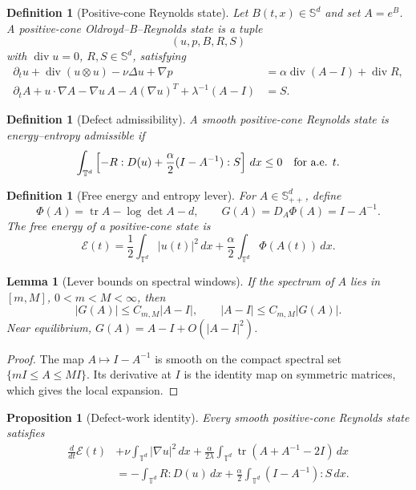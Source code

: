 \documentclass[11pt]{article}
\numberwithin{equation}{section}
\newtheorem{proposition}[theorem]{Proposition}
\newtheorem{lemma}[theorem]{Lemma}
\newtheorem{definition}[theorem]{Definition}
\newcommand{\T}{\mathbb T}
\newcommand{\Id}{I}
\newcommand{\Spp}{\mathbb S_{++}}
\newcommand{\Sym}{\mathbb S}
\newcommand{\tr}{\operatorname{tr}}
\newcommand{\divv}{\operatorname{div}}
\newcommand{\dd}{\,dx}
\newcommand{\calE}{\mathcal E}
\begin{document}
\begin{definition}[Positive-cone Reynolds state]
\label{def:positive-cone-reynolds-state}
Let \(B(t,x)\in\Sym^d\) and set \(A=e^B\).  A positive-cone
Oldroyd--B--Reynolds state is a tuple
\[
  (u,p,B,R,S)
\]
with \(\divv u=0\), \(R,S\in\Sym^d\), satisfying
\begin{align}
  \partial_t u+\divv(u\otimes u)-\nu\Delta u+\nabla p
  &=
  \alpha\divv(A-\Id)+\divv R, \label{eq:reynolds-momentum}\\
  \partial_t A+u\cdot\nabla A-\nabla u\,A-A(\nabla u)^T
  +\lambda^{-1}(A-\Id)
  &=
  S. \label{eq:reynolds-conf}
\end{align}
\end{definition}

\begin{definition}[Defect admissibility]
\label{def:defect-admissibility}
A smooth positive-cone Reynolds state is energy--entropy admissible if
\[
  \int_{\T^d}
  \left[
  -R:D(u)+\frac{\alpha}{2}(\Id-A^{-1}):S
  \right]\dd
  \le0
  \quad\hbox{for a.e. }t.
  \label{eq:admissible}
\]
\end{definition}

\begin{definition}[Free energy and entropy lever]
For \(A\in\Spp^d\), define
\[
  \Phi(A)=\tr A-\log\det A-d,
  \qquad
  G(A)=D_A\Phi(A)=\Id-A^{-1}.
\]
The free energy of a positive-cone state is
\[
  \calE(t)=
  \frac12\int_{\T^d}|u(t)|^2\,dx
  +
  \frac{\alpha}{2}\int_{\T^d}\Phi(A(t))\,dx .
\]
\end{definition}

\begin{lemma}[Lever bounds on spectral windows]
\label{lem:lever-bounds}
If the spectrum of \(A\) lies in \([m,M]\), \(0<m<M<\infty\), then
\[
  |G(A)|\le C_{m,M}|A-\Id|,
  \qquad
  |A-\Id|\le C_{m,M}|G(A)|.
\]
Near equilibrium, \(G(A)=A-\Id+O(|A-\Id|^2)\).
\end{lemma}

\begin{proof}
The map \(A\mapsto \Id-A^{-1}\) is smooth on the compact spectral set
\(\{m\Id\le A\le M\Id\}\).  Its derivative at \(\Id\) is the identity map on
symmetric matrices, which gives the local expansion.
\end{proof}

\begin{proposition}[Defect-work identity]
\label{prop:defect-work}
Every smooth positive-cone Reynolds state satisfies
\[
\begin{aligned}
  \frac{d}{dt}\calE(t)
  &+\nu\int_{\T^d}|\nabla u|^2\dd
  +\frac{\alpha}{2\lambda}
  \int_{\T^d}\tr(A+A^{-1}-2\Id)\dd\\
  &=
  -\int_{\T^d}R:D(u)\dd
  +\frac{\alpha}{2}\int_{\T^d}(\Id-A^{-1}):S\dd .
\end{aligned}
\]
\end{proposition}
\end{document}
